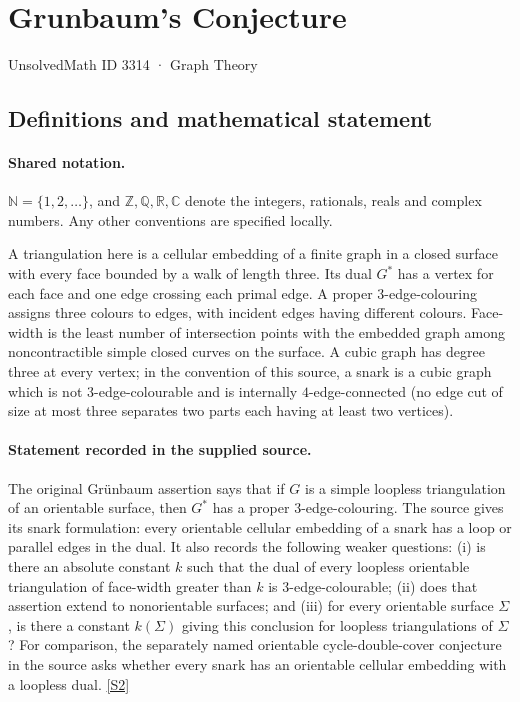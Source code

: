\documentclass[11pt]{article}
\newcommand{\sref}[2]{\hyperlink{source:#1:#2}{[S#2]}}
\begin{document}
\setcounter{section}{3313}
\section{Grunbaum's Conjecture}\label{3314}
{\small\sffamily UnsolvedMath ID 3314 · Graph Theory}
\subsection{Definitions and mathematical statement}

\paragraph{Shared notation.}$\mathbb N=\{1,2,\ldots\}$, and $\mathbb Z,\mathbb Q,\mathbb R,\mathbb C$ denote the integers, rationals, reals and complex numbers. Any other conventions are specified locally.


A triangulation here is a cellular embedding of a finite graph in a closed surface with every face bounded by a walk of length three. Its dual $G^*$ has a vertex for each face and one edge crossing each primal edge. A proper $3$-edge-colouring assigns three colours to edges, with incident edges having different colours. Face-width is the least number of intersection points with the embedded graph among noncontractible simple closed curves on the surface. A cubic graph has degree three at every vertex; in the convention of this source, a snark is a cubic graph which is not $3$-edge-colourable and is internally $4$-edge-connected (no edge cut of size at most three separates two parts each having at least two vertices).
\paragraph{Statement recorded in the supplied source.}
The original Grünbaum assertion says that if $G$ is a simple loopless triangulation of an orientable surface, then $G^*$ has a proper $3$-edge-colouring. The source gives its snark formulation: every orientable cellular embedding of a snark has a loop or parallel edges in the dual. It also records the following weaker questions: (i) is there an absolute constant $k$ such that the dual of every loopless orientable triangulation of face-width greater than $k$ is $3$-edge-colourable; (ii) does that assertion extend to nonorientable surfaces; and (iii) for every orientable surface $\Sigma$, is there a constant $k(\Sigma)$ giving this conclusion for loopless triangulations of $\Sigma$? For comparison, the separately named orientable cycle-double-cover conjecture in the source asks whether every snark has an orientable cellular embedding with a loopless dual. \sref{3314}{2}
\end{document}

